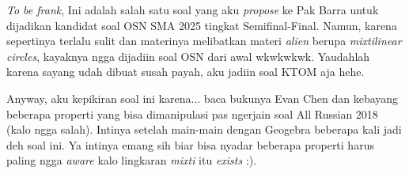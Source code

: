 \begin{center}
    \end{center}

    \textit{To be frank}, Ini adalah salah satu soal yang aku \textit{propose} ke Pak Barra untuk dijadikan kandidat soal OSN SMA 2025 tingkat Semifinal-Final. Namun, karena sepertinya terlalu sulit dan materinya melibatkan materi \textit{alien} berupa \textit{mixtilinear circles}, kayaknya ngga dijadiin soal OSN dari awal wkwkwkwk. Yaudahlah karena sayang udah dibuat susah payah, aku jadiin soal KTOM aja hehe.

    Anyway, aku kepikiran soal ini karena... baca bukunya Evan Chen dan kebayang beberapa properti yang bisa dimanipulasi pas ngerjain soal All Russian 2018 (kalo ngga salah). Intinya setelah main-main dengan Geogebra beberapa kali jadi deh soal ini. Ya intinya emang sih biar bisa nyadar beberapa properti harus paling ngga \textit{aware} kalo lingkaran \textit{mixti} itu \textit{exists} :).
    

